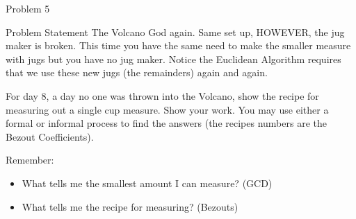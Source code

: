 \begin{problem}{Problem 5}
    \begin{statement}{Problem Statement}
        The Volcano God again. Same set up, HOWEVER, the jug maker is broken. This time you have the same need to make the smaller measure with jugs but you have no jug maker. Notice the Euclidean 
        Algorithm requires that we use these new jugs (the remainders) again and again.

        For day 8, a day no one was thrown into the Volcano, show the recipe for measuring out a single cup measure. Show your work. You may use either a formal or informal process to find the 
        answers (the recipes numbers are the Bezout Coefficients). \vspace*{1em}

        Remember:

        \begin{itemize}
            \item What tells me the smallest amount I can measure? (GCD)
            \item What tells me the recipe for measuring? (Bezouts)
        \end{itemize}
    \end{statement}


\end{problem}
